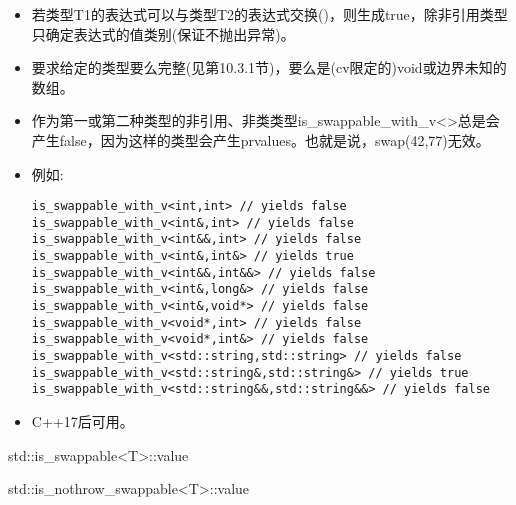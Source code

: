 \begin{itemize}
\item
若类型T1的表达式可以与类型T2的表达式交换()，则生成true，除非引用类型只确定表达式的值类别(保证不抛出异常)。

\item
要求给定的类型要么完整(见第10.3.1节)，要么是(cv限定的)void或边界未知的数组。

\item
作为第一或第二种类型的非引用、非类类型is\_swappable\_with\_v<>总是会产生false，因为这样的类型会产生prvalues。也就是说，swap(42,77)无效。

\item
例如:
\begin{lstlisting}[style=styleCXX]
is_swappable_with_v<int,int> // yields false
is_swappable_with_v<int&,int> // yields false
is_swappable_with_v<int&&,int> // yields false
is_swappable_with_v<int&,int&> // yields true
is_swappable_with_v<int&&,int&&> // yields false
is_swappable_with_v<int&,long&> // yields false
is_swappable_with_v<int&,void*> // yields false
is_swappable_with_v<void*,int> // yields false
is_swappable_with_v<void*,int&> // yields false
is_swappable_with_v<std::string,std::string> // yields false
is_swappable_with_v<std::string&,std::string&> // yields true
is_swappable_with_v<std::string&&,std::string&&> // yields false
\end{lstlisting}

\item
C++17后可用。
\end{itemize}

std::is\_swappable<T>::value

std::is\_nothrow\_swappable<T>::value


